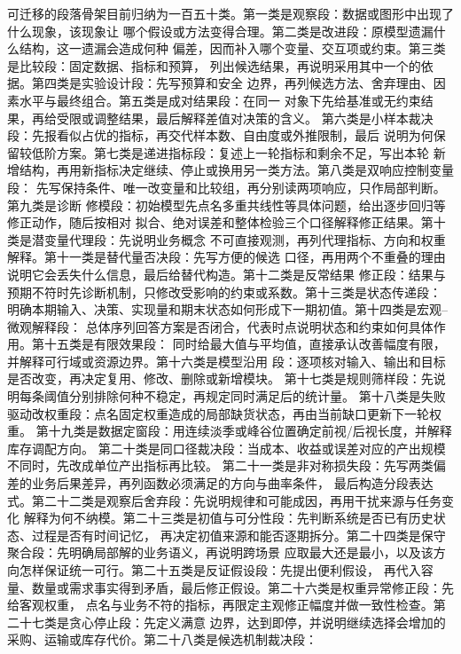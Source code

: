 可迁移的段落骨架目前归纳为一百五十类。第一类是观察段：数据或图形中出现了什么现象，该现象让
哪个假设或方法变得合理。第二类是改进段：原模型遗漏什么结构，这一遗漏会造成何种
偏差，因而补入哪个变量、交互项或约束。第三类是比较段：固定数据、指标和预算，
列出候选结果，再说明采用其中一个的依据。第四类是实验设计段：先写预算和安全
边界，再列候选方法、舍弃理由、因素水平与最终组合。第五类是成对结果段：在同一
对象下先给基准或无约束结果，再给受限或调整结果，最后解释差值对决策的含义。
第六类是小样本裁决段：先报看似占优的指标，再交代样本数、自由度或外推限制，最后
说明为何保留较低阶方案。第七类是递进指标段：复述上一轮指标和剩余不足，写出本轮
新增结构，再用新指标决定继续、停止或换用另一类方法。第八类是双响应控制变量段：
先写保持条件、唯一改变量和比较组，再分别读两项响应，只作局部判断。第九类是诊断
修模段：初始模型先点名多重共线性等具体问题，给出逐步回归等修正动作，随后按相对
拟合、绝对误差和整体检验三个口径解释修正结果。第十类是潜变量代理段：先说明业务概念
不可直接观测，再列代理指标、方向和权重解释。第十一类是替代量否决段：先写方便的候选
口径，再用两个不重叠的理由说明它会丢失什么信息，最后给替代构造。第十二类是反常结果
修正段：结果与预期不符时先诊断机制，只修改受影响的约束或系数。第十三类是状态传递段：
明确本期输入、决策、实现量和期末状态如何形成下一期初值。第十四类是宏观--微观解释段：
总体序列回答方案是否闭合，代表时点说明状态和约束如何具体作用。第十五类是有限效果段：
同时给最大值与平均值，直接承认改善幅度有限，并解释可行域或资源边界。第十六类是模型沿用
段：逐项核对输入、输出和目标是否改变，再决定复用、修改、删除或新增模块。
第十七类是规则筛样段：先说明每条阈值分别排除何种不稳定，再规定同时满足后的统计量。
第十八类是失败驱动改权重段：点名固定权重造成的局部缺货状态，再由当前缺口更新下一轮权重。
第十九类是数据定窗段：用连续淡季或峰谷位置确定前视/后视长度，并解释库存调配方向。
第二十类是同口径裁决段：当成本、收益或误差对应的产出规模不同时，先改成单位产出指标再比较。
第二十一类是非对称损失段：先写两类偏差的业务后果差异，再列函数必须满足的方向与曲率条件，
最后构造分段表达式。第二十二类是观察后舍弃段：先说明规律和可能成因，再用干扰来源与任务变化
解释为何不纳模。第二十三类是初值与可分性段：先判断系统是否已有历史状态、过程是否有时间记忆，
再决定初值来源和能否逐期拆分。第二十四类是保守聚合段：先明确局部解的业务语义，再说明跨场景
应取最大还是最小，以及该方向怎样保证统一可行。第二十五类是反证假设段：先提出便利假设，
再代入容量、数量或需求事实得到矛盾，最后修正假设。第二十六类是权重异常修正段：先给客观权重，
点名与业务不符的指标，再限定主观修正幅度并做一致性检查。第二十七类是贪心停止段：先定义满意
边界，达到即停，并说明继续选择会增加的采购、运输或库存代价。第二十八类是候选机制裁决段：
